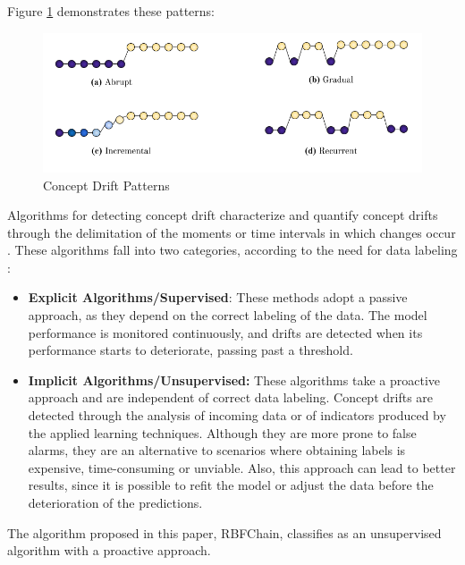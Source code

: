 \documentclass[preprint,12pt]{elsarticle}
\begin{document}
Figure \ref{fig:concept_drift_patterns} demonstrates these patterns:

\begin{figure}[h!]
\begin{center}
    \includegraphics[scale=0.65]{img/concept_drift_patterns.png}
    \caption{Concept Drift Patterns}
    \label{fig:concept_drift_patterns}
\end{center}
\end{figure}

Algorithms for detecting concept drift characterize and quantify concept drifts through the delimitation of the moments or time intervals in which changes occur \cite{Basseville:1993:DAC:151741}.
%
These algorithms fall into two categories, according to the need for data labeling \cite{Zliobaite:2010}:

\begin{itemize}
    \item \textbf{Explicit Algorithms/Supervised}: These methods adopt a passive approach, as they depend on the correct labeling of the data.
    The model performance is monitored continuously, and drifts are detected when its performance starts to deteriorate, passing past a threshold.
    \item \textbf{Implicit Algorithms/Unsupervised:} These algorithms take a proactive approach and are independent of correct data labeling.
    Concept drifts are detected through the analysis of incoming data or of indicators produced by the applied learning techniques.
    Although they are more prone to false alarms, they are an alternative to scenarios where obtaining labels is expensive, time-consuming or unviable.
    Also, this approach can lead to better results, since it is possible to refit the model or adjust the data before the deterioration of the predictions.
\end{itemize}

The algorithm proposed in this paper, RBFChain, classifies as an unsupervised algorithm with a proactive approach.
\end{document}
